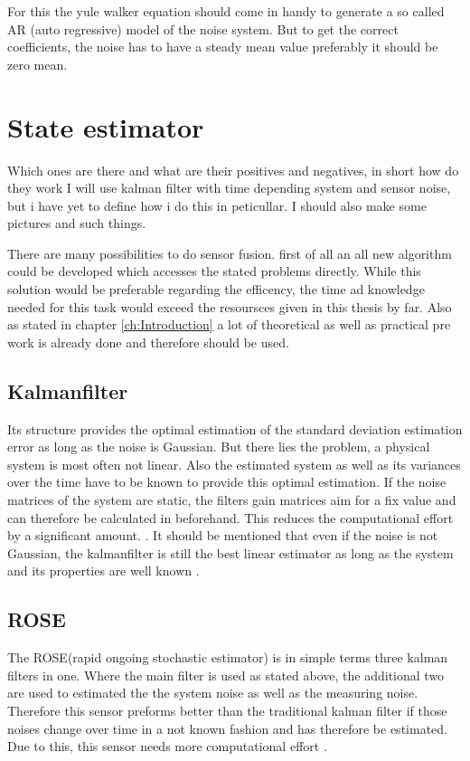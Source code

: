   
  For this the yule walker equation should come in handy to generate a so called AR (auto regressive) model of the noise system.
  But to get the correct coefficients, the noise has to have a steady mean value preferably it should be zero mean.  
  
  \section{State estimator}
  Which ones are there and what are their positives and negatives, in short how do they work
  I will use kalman filter with time depending system and sensor noise, but i have yet to define how i do this in peticullar.
  I should also make some pictures and such things.
  
  There are many possibilities to do sensor fusion. first of all an all new algorithm could be developed which accesses the 
  stated problems directly. While this solution would be preferable regarding the efficency, the 
  time ad knowledge needed for this task would exceed the resoursces given in this thesis by far.
  Also as stated in chapter \ref{ch:Introduction} a lot of theoretical as well as practical pre work is
  already done and therefore should be used. 
  
  \subsection{Kalmanfilter}
 
 
  Its structure provides the optimal estimation of the standard deviation estimation error as long as the noise is Gaussian.
  But there lies the problem, a physical system is most often not linear.
  Also the estimated system as well as its variances over the time have to be known to provide this optimal estimation.
  If the noise matrices of the system are static, the filters gain matrices aim for a fix value and can therefore be calculated in beforehand.
  This reduces the computational effort by a significant amount. \cite{DavidWSchultz2004}.
  It should be mentioned that even if the noise is not Gaussian, the kalmanfilter is still the best
  linear estimator as long as the system and its properties are well known \cite{SimonDan2006Ose:}.
  
  \subsection{ROSE}
  The ROSE(rapid ongoing stochastic estimator) is in simple terms three kalman filters in one.
  Where the main filter is used as stated above, the additional two are used to estimated the 
  the system noise as well as the measuring noise. Therefore this sensor preforms better than the traditional kalman filter
  if those noises change over time in a not known fashion and has therefore be estimated.
  Due to this, this sensor needs more computational effort \cite{DavidWSchultz2004}. 
  
